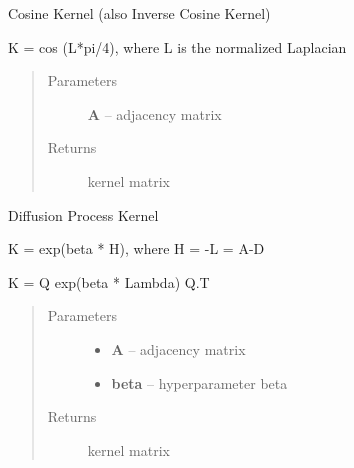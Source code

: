 \documentclass[letterpaper,10pt,english]{sphinxmanual}
\begin{document}

\begin{fulllineitems}
\label{pyGPs.GraphExtensions:pyGPs.GraphExtensions.nodeKernels.cosKernel}
Cosine Kernel (also Inverse Cosine Kernel)

K = cos (L*pi/4), where L is the normalized Laplacian
\begin{quote}\begin{description}
\item[{Parameters}] \leavevmode
\textbf{A} -- adjacency matrix

\item[{Returns}] \leavevmode
kernel matrix

\end{description}\end{quote}

\end{fulllineitems}


\begin{fulllineitems}
\label{pyGPs.GraphExtensions:pyGPs.GraphExtensions.nodeKernels.diffKernel}
Diffusion Process Kernel

K = exp(beta * H), where H = -L = A-D

K = Q exp(beta * Lambda) Q.T
\begin{quote}\begin{description}
\item[{Parameters}] \leavevmode\begin{itemize}
\item {} 
\textbf{A} -- adjacency matrix

\item {} 
\textbf{beta} -- hyperparameter beta

\end{itemize}

\item[{Returns}] \leavevmode
kernel matrix

\end{description}\end{quote}

\end{fulllineitems}
\end{document}

